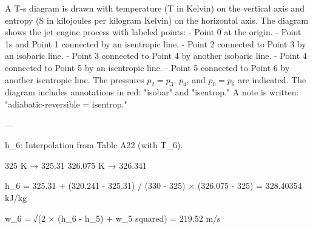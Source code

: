 A T-s diagram is drawn with temperature (T in Kelvin) on the vertical axis and entropy (S in kilojoules per kilogram Kelvin) on the horizontal axis. The diagram shows the jet engine process with labeled points:  
- Point 0 at the origin.  
- Point 1s and Point 1 connected by an isentropic line.  
- Point 2 connected to Point 3 by an isobaric line.  
- Point 3 connected to Point 4 by another isobaric line.  
- Point 4 connected to Point 5 by an isentropic line.  
- Point 5 connected to Point 6 by another isentropic line.  
The pressures \( p_2 = p_3 \), \( p_4 \), and \( p_0 = p_6 \) are indicated.  
The diagram includes annotations in red: "isobar" and "isentrop."  
A note is written: "adiabatic-reversible = isentrop."

---

h_6: Interpolation from Table A22 (with T_6).  

325 K → 325.31  
326.075 K → 326.341  

h_6 = 325.31 + (320.241 - 325.31) / (330 - 325) × (326.075 - 325)  
= 328.40354 kJ/kg  

w_6 = √(2 × (h_6 - h_5) + w_5 squared) = 219.52 m/s